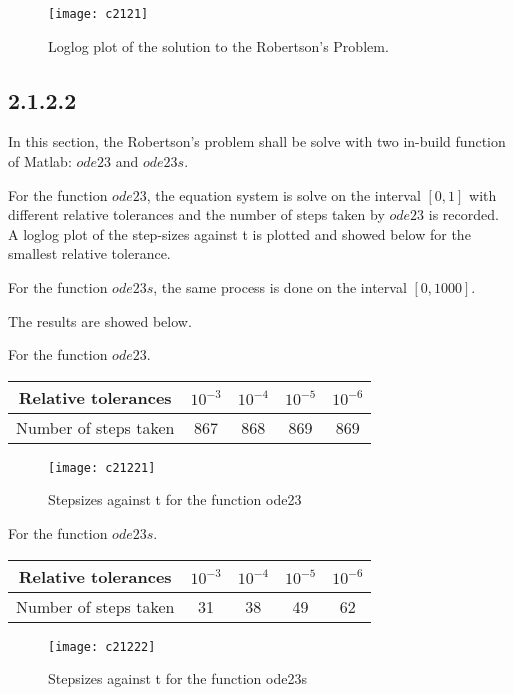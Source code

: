 \documentclass[11pt,a4paper,roman]{scrartcl}
\begin{document}
\begin{figure}[h]
\texttt{[image: c2121]}
\caption{Loglog plot of the solution to the Robertson's Problem.}
\end{figure}

\newpage
\subsection*{2.1.2.2}
In this section, the Robertson's problem shall be solve with two in-build function of Matlab: $ode23$ and $ode23s$.

For the function $ode23$, the equation system is solve on the interval $[0, 1]$ with different relative tolerances and the number of steps taken by $ode23$ is recorded. A loglog plot of the step-sizes against t is plotted and showed below for the smallest relative tolerance. 

For the function $ode23s$, the same process is done on the interval $[0, 1000]$. 

The results are showed below. 

For the function $ode23$. 

\begin{table}
\centering
\begin{tabular}{| c | c | c | c | c |}
\hline 
Relative tolerances & $10^{-3}$ & $10^{-4}$ & $10^{-5}$ & $10^{-6}$ \\
\hline 
Number of steps taken & 867 & 868 & 869 & 869\\
\hline 
\end{tabular}
\end{table}


\begin{figure}[H]
\texttt{[image: c21221]}
\caption{Stepsizes against t for the function ode23}
\end{figure}

For the function $ode23s$. 

\begin{table}
\centering
\begin{tabular}{| c | c | c | c | c |}
\hline 
Relative tolerances & $10^{-3}$ & $10^{-4}$ & $10^{-5}$ & $10^{-6}$ \\
\hline 
Number of steps taken & 31 & 38 & 49 & 62\\
\hline 
\end{tabular}
\end{table}

\begin{figure}[H]
\texttt{[image: c21222]}
\caption{Stepsizes against t for the function ode23s}
\end{figure}
\end{document}
